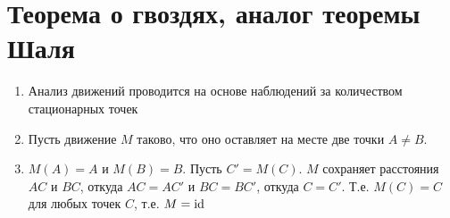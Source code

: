 \section{Теорема о гвоздях, аналог теоремы Шаля}




\begin{enumerate}
\item Анализ движений проводится на основе наблюдений за количеством стационарных точек
\item Пусть движение $M$ таково, что оно оставляет на месте две точки $A\ne B$.
\item $M(A)=A$ и $M(B)=B$. Пусть $C'=M(C)$. $M$ сохраняет расстояния $AC$ и $BC$, откуда $AC=AC'$ и $BC=BC'$, откуда $C=C'$. Т.е. $M(C)=C$ для любых точек $C$, т.е. $M=\mathrm{id}$


\end{enumerate}
